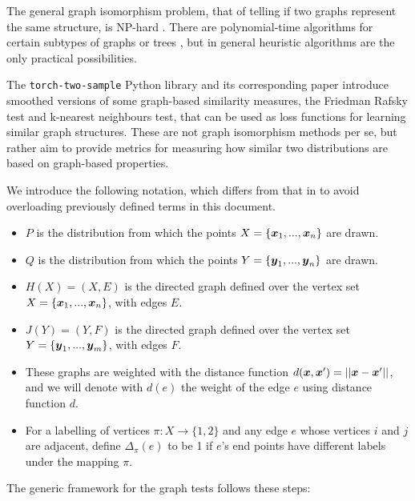 The general graph isomorphism problem, that of telling if two graphs represent the same structure, is NP-hard \cite{GraphIsomorphismNPHard}. There are polynomial-time algorithms for certain subtypes of graphs or trees , but in general heuristic algorithms are the only practical possibilities. 

The \texttt{torch-two-sample} Python library and its corresponding paper \cite{torchtwosample} introduce smoothed versions of some graph-based similarity measures, the Friedman Rafsky test and k-nearest neighbours test, that can be used as loss functions for learning similar graph structures. These are not graph isomorphism methods per se, but rather aim to provide metrics for measuring how similar two distributions are based on graph-based properties.


We introduce the following notation, which differs from that in \cite{torchtwosample} to avoid overloading previously defined terms in this document. 

\begin{itemize}
    \item $P$ is the distribution from which the points $X = \{\boldsymbol{x}_1, ..., \boldsymbol{x}_n \}$ are drawn.
    \item $Q$ is the distribution from which the points $Y = \{\boldsymbol{y}_1, ..., \boldsymbol{y}_n \}$ are drawn.
    \item $H(X) = (X, E)$ is the directed graph defined over the vertex set $X = \{\boldsymbol{x}_1, ..., \boldsymbol{x}_n \}$, with edges $E$.
    \item $J(Y) = (Y, F) $ is the directed graph defined over the vertex set $Y = \{\boldsymbol{y}_1, ..., \boldsymbol{y}_m \}$, with edges $F$. 
    \item These graphs are weighted with the distance function $d(\boldsymbol{x}, \boldsymbol{x}') = || \boldsymbol{x} - \boldsymbol{x}'||$, and we will denote with $d(e)$ the weight of the edge $e$ using distance function $d$. 
    \item For a labelling of vertices $\pi: X \rightarrow \{1, 2\}$ and any edge $e$ whose vertices $i$ and $j$ are adjacent, define $\Delta_{\pi}(e)$ to be 1 if $e$'s end points have different labels under the mapping $\pi$. 
\end{itemize}

The generic framework for the graph tests follows these steps:

